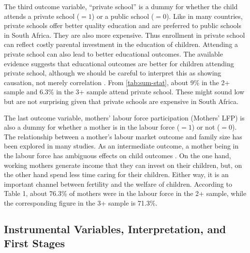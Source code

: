 The third outcome variable, \enquote{private school} is a dummy for whether the child attends a private school ($ = 1 $) or a public school ($ = 0 $). Like in many countries, private schools offer better quality education and are preferred to public schools in South Africa. They are also more expensive. Thus enrollment in private school can reflect costly parental investment in the education of children. Attending a private school can also lead to better educational outcomes. The available evidence suggests that educational outcomes are better for children attending private school, although we should be careful to interpret this as showing causation, not merely correlation \parencite{caceres-delpiano_impacts_2006}. From \autoref{tab:sum-stat}, about 9\% in the 2+ sample and 6.3\% in the 3+ sample attend private school. These might sound low but are not surprising given that private schools are expensive in South Africa.

The last outcome variable, mothers' labour force participation (Mothers' LFP) is also a dummy for whether a mother is in the labour force ($ =1 $) or not ($ =0 $). The relationship between a mother's labour market outcome and family size has been explored in many studies. As an intermediate outcome, a mother being in the labour force has ambiguous effects on child outcomes \parencite{caceres-delpiano_impacts_2006}. On the one hand, working mothers generate income that they can invest on their children, but, on the other hand spend less time caring for their children. Either way, it is an important channel between fertility and the welfare of children. According to Table 1, about 76.3\% of mothers were in the labour force in the 2+ sample, while the corresponding figure in the 3+ sample is 71.3\%.


\subsection{Instrumental Variables, Interpretation, and First Stages}
\label{section:IVs}

